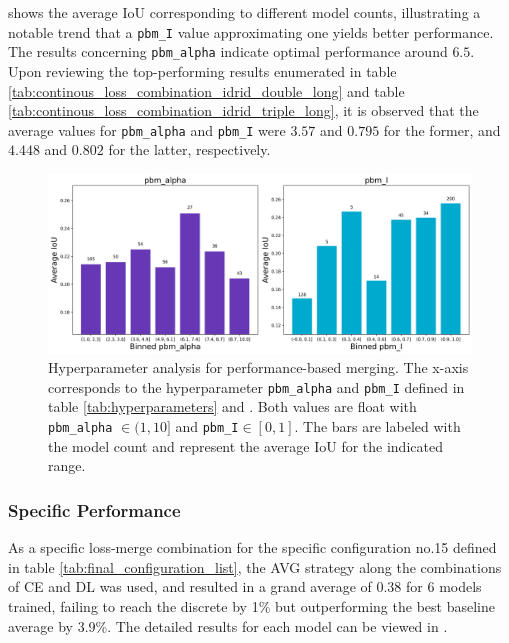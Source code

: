  shows the average \ac{IoU} corresponding to different model counts, illustrating a notable trend that a \texttt{pbm\_I} value approximating one yields better performance. The results concerning \texttt{pbm\_alpha} indicate optimal performance around $6.5$. Upon reviewing the top-performing results enumerated in table \ref{tab:continous_loss_combination_idrid_double_long} and table \ref{tab:continous_loss_combination_idrid_triple_long}, it is observed that the average values for \texttt{pbm\_alpha} and \texttt{pbm\_I} were $3.57$ and $0.795$ for the former, and $4.448$ and $0.802$ for the latter, respectively.

\begin{figure}[H]%
  \centering
  \includegraphics[width=\imgWidthL]{images/continous_hyperparameter_total_idrid.png}
  \caption[Hyperparameter analysis]{Hyperparameter analysis for performance-based merging. The x-axis corresponds to the hyperparameter \texttt{pbm\_alpha} and \texttt{pbm\_I} defined in table \ref{tab:hyperparameters} and . Both values are float with \texttt{pbm\_alpha} $\in (1,10]$ and \texttt{pbm\_I}$\in [0,1]$. The bars are labeled with the model count and represent the average \ac{IoU} for the indicated range.}
  \label{continous_results_total_idrid}
\end{figure}

\subsubsection*{Specific Performance}
As a specific loss-merge combination for the specific configuration no.15 defined in table \ref{tab:final_configuration_list}, the AVG strategy along the combinations of \ac{CE} and \ac{DL} was used, and resulted in a grand average of $0.38$ for 6 models trained, failing to reach the discrete by 1\% but outperforming the best baseline average by 3.9\%. The detailed results for each model can be viewed in .
